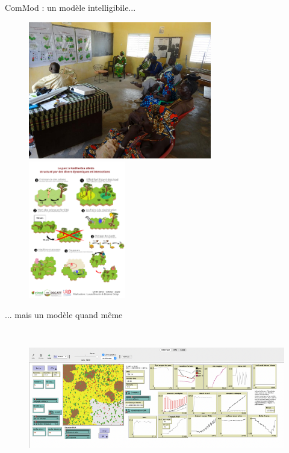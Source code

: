 \documentclass[aspectratio=169]{beamer}
\begin{document}
\begin{frame}{ComMod : un modèle intelligibile...}
    \begin{center}
        \vspace{-1em}
        \begin{figure}
            \centering
            \includegraphics[height = 6cm]{img/atelierPoster.jpg}~
            \includegraphics[height = 6cm]{img/poster2.png}
        \end{figure}
    \end{center}
\end{frame}

\begin{frame}{... mais un modèle quand même}
    \begin{center}
        \vspace{-1em}
        \begin{figure}
            \centering
            \includegraphics[height = 6cm]{img/ideModele.png}
        \end{figure}
    \end{center}
\end{frame}
\end{document}
